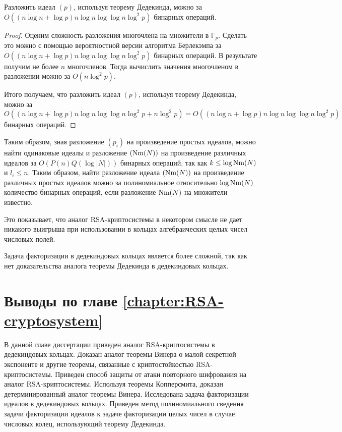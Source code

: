 \documentclass[_00_dissertation.tex]{subfiles}
\begin{document}
\begin{proposition}
    Разложить идеал $(p)$, используя теорему Дедекинда, можно за $O((n\log n + \log p)n\log n\log\log n\log^2 p)$ бинарных операций.
\end{proposition}
\begin{proof}
    Оценим сложность разложения многочлена на множители в $\mathbb{F}_p$.
    Сделать это можно с помощью вероятностной версии алгоритма Берлекэмпа за $O((n\log n + \log p)n\log n\log\log n\log^2 p)$ бинарных операций.
    В результате получим не более $n$ многочленов.
    Тогда вычислить значения многочленом в разложении можно за $O(n\log^2 p)$.

    Итого получаем, что разложить идеал $(p)$, используя теорему Дедекинда, можно за $O((n\log n + \log p)n\log n\log\log n\log^2 p + n\log^2 p) = O((n\log n + \log p)n\log n\log\log n\log^2 p)$ бинарных операций.
\end{proof}

\begin{remark}
    Таким образом, зная разложение $(p_i)$ на произведение простых идеалов, можно найти одинаковые идеалы и разложение $(\textrm{Nm}(N))$ на произведение различных идеалов за $O(P(n)Q(\log |N|))$ бинарных операций, так как $k \le \log \textrm{Nm}(N)$ и $l_i \le n$.
    Таким образом, найти разложение идеала $(\textrm{Nm}(N))$ на произведение различных простых идеалов можно за полиномиальное относительно $\log\textrm{Nm}(N)$ количество бинарных операций, если разложение $\textrm{Nm}(N)$ на множители известно.

    Это показывает, что аналог RSA-криптосистемы в некотором смысле не дает никакого выигрыша при использовании в кольцах алгебраических целых чисел числовых полей.
\end{remark}

\begin{remark}
    Задача факторизации в дедекиндовых кольцах является более сложной, так как нет доказательства аналога теоремы Дедекинда в дедекиндовых кольцах.
\end{remark}

\section*{Выводы по главе \ref{chapter:RSA-cryptosystem}}

В данной главе диссертации приведен аналог RSA-криптосистемы в дедекиндовых кольцах.
Доказан аналог теоремы Винера о малой секретной экспоненте и другие теоремы, связанные с криптостойкостью RSA-криптосистемы.
Приведен способ защиты от атаки повторного шифрования на аналог RSA-криптосистемы.
Используя теоремы Копперсмита, доказан детерминированный аналог теоремы Винера.
Исследована задача факторизации идеалов в дедекиндовых кольцах.
Приведен метод полиномиального сведения задачи факторизации идеалов к задаче факторизации целых чисел в случае числовых колец, использующий теорему Дедекинда.

\onlyinsubfile{
    
    
}
\end{document}
